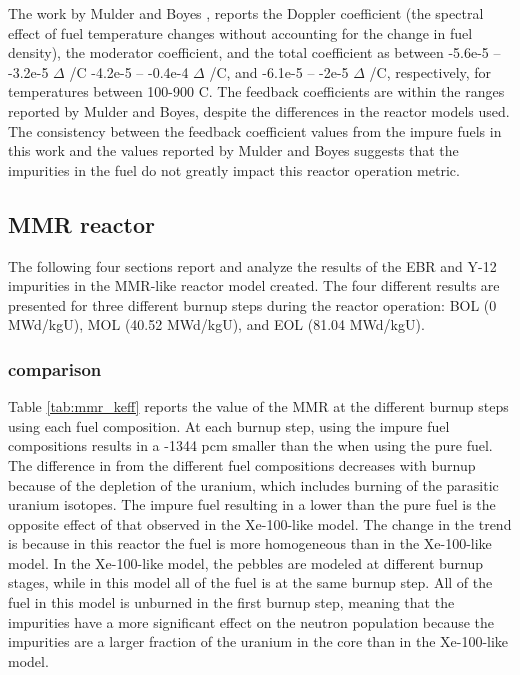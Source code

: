 The work by Mulder and Boyes \cite{mulder_neutronics_2020}, reports 
the Doppler coefficient (the spectral effect of fuel temperature changes 
without accounting for the change in fuel density), the moderator coefficient, 
and the total coefficient as between -5.6e-5 -- -3.2e-5 $\Delta$ 
\keff/\textdegree C
-4.2e-5 -- -0.4e-4 $\Delta$ \keff/\textdegree C, and -6.1e-5 -- -2e-5 
$\Delta$ \keff/\textdegree C, respectively, for temperatures between 100-900
\textdegree C. The feedback coefficients are within the ranges reported 
by Mulder and Boyes, despite the differences in the reactor models used.
The consistency between the feedback coefficient values from the impure 
fuels in this work and the values reported by Mulder and Boyes suggests that 
the impurities in the fuel do not greatly impact this reactor operation 
metric.  

\subsection{MMR reactor}
The following four sections report and analyze the results of the 
\gls{EBR} and Y-12 impurities in the \gls{MMR}-like reactor model 
created. The four different results are presented for three different 
burnup steps during the reactor operation: \gls{BOL} (0 MWd/kgU),
\gls{MOL} (40.52 MWd/kgU), and \gls{EOL} (81.04 MWd/kgU). 

\subsubsection{\keff comparison}
Table \ref{tab:mmr_keff} reports the \keff value of the \gls{MMR} at the 
different burnup steps using each fuel composition. At each burnup step, 
using the impure fuel compositions results in a -1344 pcm 
smaller than the \keff when using the pure fuel. The difference in \keff 
from the different fuel compositions decreases with burnup because of 
the depletion of the uranium, which includes burning of the parasitic 
uranium isotopes. The impure fuel resulting in a lower \keff 
than the pure fuel is the opposite 
effect of that observed in the Xe-100-like model. The change in the trend 
is because in this reactor the fuel is more homogeneous than in 
the Xe-100-like model. In the Xe-100-like model, the pebbles are modeled 
at different burnup stages, while in this model all of the fuel is at the 
same burnup step. All of the fuel in this model is unburned in the 
first burnup step, meaning that the impurities have a more significant 
effect on the neutron population because the impurities are a larger fraction 
of the uranium in the core than in the Xe-100-like model.

